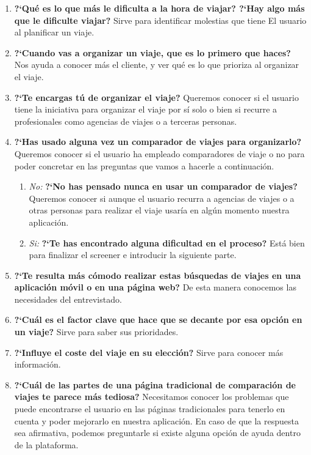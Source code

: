 \begin{enumerate}
    \item {\textbf{?`Qué es lo que más le dificulta a la hora de viajar? ?`Hay algo más que le dificulte viajar?}} Sirve para identificar molestias que tiene
                El usuario al planificar un viaje.
    \item {\textbf{?`Cuando vas a organizar un viaje, que es lo primero que haces?}} Nos ayuda a conocer más el cliente, y ver qué es lo que
                    prioriza al organizar el viaje.
    \item {\textbf{?`Te encargas tú de organizar el viaje?}} Queremos conocer si el usuario tiene la iniciativa para organizar el viaje por sí solo o bien si
                recurre a profesionales como agencias de viajes o a terceras personas.
    \item{ \textbf{?`Has usado alguna vez un comparador de viajes para organizarlo?}} Queremos conocer si el usuario ha empleado comparadores de viaje o no para poder concretar en las preguntas que vamos a hacerle a continuación.
    \begin{enumerate}
        \item {\textit{No:}} \textbf{?`No has pensado nunca en usar un comparador de viajes?} Queremos conocer si aunque el usuario recurra a agencias de viajes o
                        a otras personas para realizar el viaje usaría en algún momento nuestra aplicación.
        \item {\textit{Si:}} \textbf{?`Te has encontrado alguna dificultad en el proceso?} Está bien para finalizar el screener e introducir la siguiente parte.
    \end{enumerate}
    \item {\textbf{?`Te resulta más cómodo realizar estas búsquedas de viajes en una aplicación móvil o en una página web?}} De esta manera conocemos las necesidades del entrevistado.
    \item {\textbf{?`Cuál es el factor clave que hace que se decante por esa opción en un viaje?}} Sirve para saber sus prioridades.
    \item {\textbf{?`Influye el coste del viaje en su elección?}} Sirve para conocer más información.
    \item {\textbf{?`Cuál de las partes de una página tradicional de comparación de viajes te parece más tediosa?}} Necesitamos conocer los problemas que
                puede encontrarse el usuario en las páginas tradicionales para tenerlo en cuenta y poder mejorarlo en nuestra aplicación. En caso de que
                la respuesta sea afirmativa, podemos preguntarle si existe alguna opción de ayuda dentro de la plataforma.

\end{enumerate}
